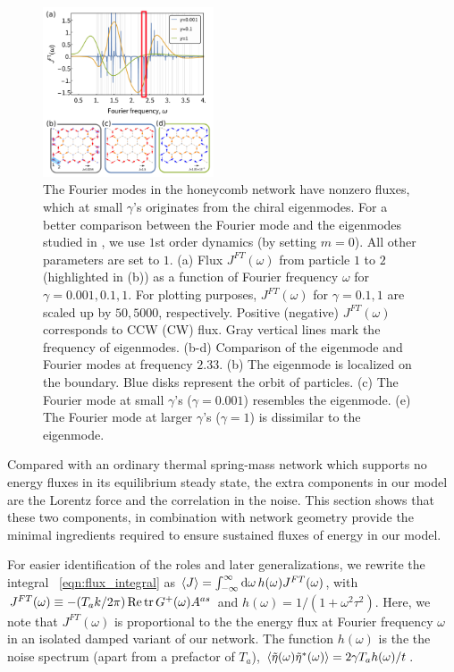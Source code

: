 \documentclass[
 preprint,
 preprintnumbers,
 amsmath,amssymb,
 aps,
 pre,
 longbibliography,
 superscriptaddress,
 10pt, twocolumn
]{revtex4-1}
\begin{document}
\begin{figure}[ht]
	\centering
	\includegraphics[width=0.45\textwidth]{2_Fourier_modes.pdf}
    \caption{The Fourier modes in the honeycomb network have nonzero fluxes, which at small $\gamma$'s originates from the chiral eigenmodes. For a better comparison between the Fourier mode and the eigenmodes studied in \cite{Nash2015TopologicalMechanics}, we use $1$st order dynamics (by setting $m=0$). All other parameters are set to $1$.
    (a) Flux $J^{FT}(\omega)$ from particle $1$ to $2$ (highlighted in (b)) as a function of Fourier frequency $\omega$ for $\gamma=0.001,0.1,1$. For plotting purposes, $J^{FT}(\omega)$ for $\gamma=0.1,1$ are scaled up by $50,5000$, respectively. Positive (negative) $J^{FT}(\omega)$ corresponds to CCW (CW) flux. Gray vertical lines mark the frequency of eigenmodes.
    (b-d) Comparison of the eigenmode and Fourier modes at frequency $2.33$.
    (b) The eigenmode is localized on the boundary. Blue disks represent the orbit of particles.
    (c) The Fourier mode at small $\gamma$'s ($\gamma=0.001$) resembles the eigenmode.
    (e) The Fourier mode at larger $\gamma$'s ($\gamma=1$) is dissimilar to the eigenmode.
    }
    \label{fig:Fourier_modes}
\end{figure}

Compared with an ordinary thermal spring-mass network which supports no energy fluxes in its equilibrium steady state, the extra components in our model are the Lorentz force and the correlation in the noise.
This section shows that these two components, in combination with network geometry provide the minimal ingredients required to ensure sustained fluxes of energy in our model. 

For easier identification of the roles and later generalizations, we rewrite the integral \eqnname~\eqref{eqn:flux_integral} as $\expval{J} = \int_{-\infty}^\infty \dd{\omega} h(\omega) J^{FT}(\omega)$, with $J^{FT}(\omega) \equiv -(T_a k/2\pi) \Re \tr G^+(\omega)A^{as}$ and $h(\omega)=1/(1+\omega^2\tau^2)$. Here, we note that $J^{FT}(\omega)$ is proportional to the the energy flux at Fourier frequency $\omega$ in an isolated damped variant of our network. The function $h(\omega)$ is the the noise spectrum (apart from a prefactor of $T_a$), $\expval{\tilde{\eta}(\omega)\tilde{\eta}^*(\omega)} = 2\gamma T_a h(\omega) / t$.
\end{document}

